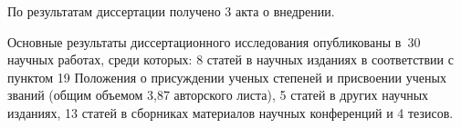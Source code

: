 По результатам диссертации получено 3 акта о внедрении.


\vspace{3mm}
\publications
\vspace{3mm}

Основные результаты диссертационного исследования опубликованы в~30 научных работах, среди которых: 8 статей в научных изданиях в соответствии с пунктом 19 Положения о присуждении ученых степеней и присвоении ученых званий (общим объемом 3,87 авторского листа), 5 статей в других научных изданиях, 13 статей в сборниках материалов научных конференций и 4 тезисов.
